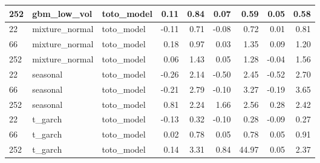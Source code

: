 {\begin{tabular}{lllrrrrrr}
252 & gbm\_low\_vol & toto\_model & 0.11 & 0.84 & 0.07 & 0.59 & 0.05 & 0.58 \\
\midrule
22 & mixture\_normal & toto\_model & -0.11 & 0.71 & -0.08 & 0.72 & 0.01 & 0.81 \\
66 & mixture\_normal & toto\_model & 0.18 & 0.97 & 0.03 & 1.35 & 0.09 & 1.20 \\
252 & mixture\_normal & toto\_model & 0.06 & 1.43 & 0.05 & 1.28 & -0.04 & 1.56 \\
\midrule
22 & seasonal & toto\_model & -0.26 & 2.14 & -0.50 & 2.45 & -0.52 & 2.70 \\
66 & seasonal & toto\_model & -0.21 & 2.79 & -0.10 & 3.27 & -0.19 & 3.65 \\
252 & seasonal & toto\_model & 0.81 & 2.24 & 1.66 & 2.56 & 0.28 & 2.42 \\
\midrule
22 & t\_garch & toto\_model & -0.13 & 0.32 & -0.10 & 0.28 & -0.09 & 0.27 \\
66 & t\_garch & toto\_model & 0.02 & 0.78 & 0.05 & 0.78 & 0.05 & 0.91 \\
252 & t\_garch & toto\_model & 0.14 & 3.31 & 0.84 & 44.97 & 0.05 & 2.37 \\
\bottomrule
\end{tabular}
}
